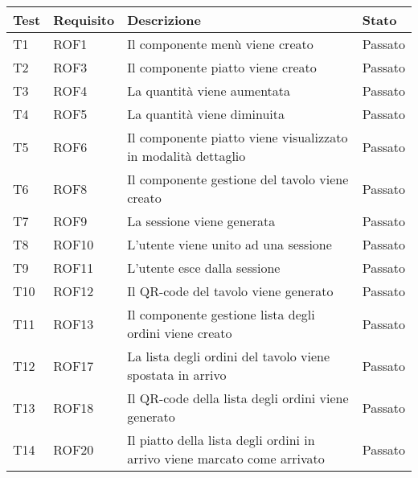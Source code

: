 \begin{center}
    \renewcommand{\arraystretch}{1.5}
    \begin{longtable}{ |p{1cm}|p{1.5cm}|p{9cm}|p{1.5cm}|  }
        \hline
        \hline
        Test&Requisito&Descrizione &Stato \\
        \hline
        \endhead
        T1&ROF1&Il componente menù viene creato&Passato \\
        T2&ROF3&Il componente piatto viene creato&Passato \\
        T3&ROF4&La quantità viene aumentata&Passato \\
        T4&ROF5&La quantità viene diminuita&Passato \\
        T5&ROF6&Il componente piatto viene visualizzato in modalità dettaglio&Passato \\
        T6&ROF8&Il componente gestione del tavolo viene creato &Passato \\
        T7&ROF9&La sessione viene generata&Passato\\
        T8&ROF10&L'utente viene unito ad una sessione&Passato \\
        T9&ROF11&L'utente esce dalla sessione&Passato\\
        T10&ROF12&Il QR-code del tavolo viene generato&Passato\\
        T11&ROF13&Il componente gestione lista degli ordini viene creato&Passato\\
        T12&ROF17&La lista degli ordini del tavolo viene spostata in arrivo&Passato\\
        T13&ROF18&Il QR-code della lista degli ordini viene generato &Passato\\
        T14&ROF20&Il piatto della lista degli ordini in arrivo viene marcato come arrivato&Passato\\

\end{longtable}
\end{center}
